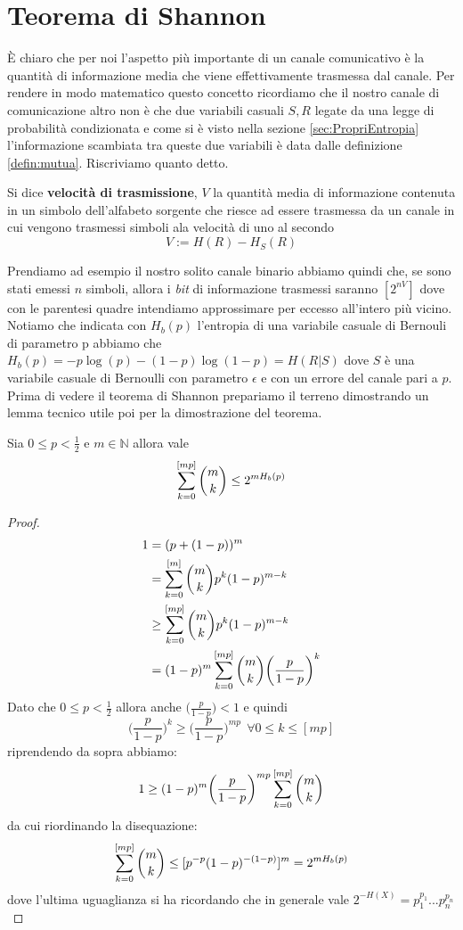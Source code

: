 \vspace{15pt}


\section{Teorema di Shannon}
\vspace{10pt}

È chiaro che per noi l'aspetto più importante di un canale comunicativo è la quantità di informazione media che viene effettivamente trasmessa dal canale. Per rendere in modo matematico questo concetto ricordiamo che il nostro canale di comunicazione altro non è che due variabili casuali $S,R$ legate da una legge di probabilità condizionata e come si è visto nella sezione \ref{sec:PropriEntropia} l'informazione scambiata tra queste due variabili è data dalle definizione \ref{defin:mutua}. Riscriviamo quanto detto.
\begin{defi}
Si dice \textbf{velocità di trasmissione}, $V$ la quantità media di informazione contenuta in un simbolo dell'alfabeto sorgente che riesce ad essere trasmessa da un canale in cui vengono trasmessi simboli ala velocità di uno al secondo
$$V:=H(R)-H_S(R)$$
\end{defi}
Prendiamo ad esempio il nostro solito canale binario abbiamo quindi che, se sono stati emessi $n$ simboli, allora i \textit{bit} di informazione trasmessi saranno $[2^{nV}]$ dove con le parentesi quadre intendiamo approssimare per eccesso all'intero più vicino.\\
Notiamo che indicata con $H_b(p)$ l'entropia di una variabile casuale di Bernouli di parametro p abbiamo che $H_b(p)=-p \log(p)- (1-p) \log(1-p) =H(R|S)$ dove $S$ è una variabile casuale di Bernoulli con parametro $\epsilon$ e con un errore del canale pari a $p$.\\
Prima di vedere il teorema di Shannon prepariamo il terreno dimostrando un lemma tecnico utile poi per la dimostrazione del teorema.
\begin{lem}
Sia $0 \leq p < \frac{1}{2}$ e $m\in \mathbb{N}$ allora vale
\begin{equation} \label{eq:7.6}
\sum_{k=0}^{[mp]} {m \choose k} \leq 2^{mH_b(p)}
\end{equation}
\end{lem}
\begin{proof}
 \[
\begin{split}
1&=(p+(1-p))^m \\
& = \sum_{k=0}^{[m]}  {m \choose k} p^k (1-p)^{m-k}\\
& \geq   \sum_{k=0}^{[mp]} {m \choose k} p^k (1-p)^{m-k} \\
&=(1-p)^m \sum_{k=0}^{[mp]} {m \choose k} \bigg( \frac{p}{1-p} \bigg)^k
\end{split}
\]
Dato che $0 \leq p < \frac{1}{2}$ allora anche $\bigg( \frac{p}{1-p} \bigg)<1$ e quindi
$$\bigg( \frac{p}{1-p} \bigg)^k \geq \bigg( \frac{p}{1-p} \bigg)^{mp} \ \ \forall 0\leq k \leq [mp]$$
riprendendo da sopra abbiamo:
$$1 \geq (1-p)^m  \bigg( \frac{p}{1-p} \bigg)^{mp} \sum_{k=0}^{[mp]} {m \choose k}$$
da cui riordinando la disequazione:
$$\sum_{k=0}^{[mp]} {m \choose k} \leq [p^{-p}(1-p)^{-(1-p)}]^m= 2^{mH_b(p)}$$
dove l'ultima uguaglianza si ha ricordando che in generale vale $2^{-H(X)}=p_1^{p_1}...p_n^{p_n}$
\end{proof}
